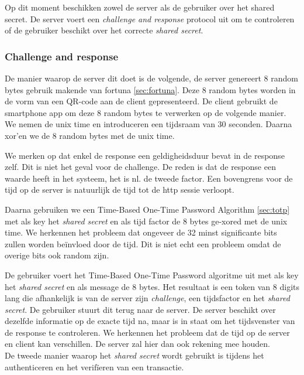 \documentclass[11pt]{article}
\begin{document}
Op dit moment beschikken zowel de server als de gebruiker over het shared secret. De server voert een \emph{challenge and response} protocol uit om te controleren of de gebruiker beschikt over het correcte \emph{shared secret}.\\

\subsubsection{Challenge and response}
De manier waarop de server dit doet is de volgende, de server genereert 8 random bytes gebruik makende van fortuna \ref{sec:fortuna}. Deze 8 random bytes worden in de vorm van een QR-code aan de client gepresenteerd. De client gebruikt de smartphone app om deze 8 random bytes te verwerken op de volgende manier.\\

We nemen de unix time en introduceren een tijdsraam van 30 seconden. Daarna xor'en we de 8 random bytes met de unix time.

We merken op dat enkel de response een geldigheidsduur bevat in de response zelf. Dit is niet het geval voor de challenge. De reden is dat de response een waarde heeft in het systeem, het is nl. de tweede factor. Een bovengrens voor de tijd op de server is natuurlijk de tijd tot de http sessie verloopt.

Daarna gebruiken we een Time-Based One-Time Password Algorithm \ref{sec:totp} met als key het \emph{shared secret} en als tijd factor de 8 bytes ge-xored met de unix time. We herkennen het probleem dat ongeveer de 32 minst significante bits zullen worden be\"invloed door de tijd. Dit is niet echt een probleem omdat de overige bits ook random zijn.

De gebruiker voert het Time-Based One-Time Password algoritme uit met als key het \emph{shared secret} en als message de 8 bytes. Het resultaat is een token van 8 digits lang die afhankelijk is van de server zijn \emph{challenge}, een tijdsfactor en het \emph{shared secret}. De gebruiker stuurt dit terug naar de server. De server beschikt over dezelfde informatie op de exacte tijd na, maar is in staat om het tijdsvenster van de response te controleren. We herkennen het probleem dat de tijd op de server en client kan verschillen. De server zal hier dan ook rekening mee houden.\\

De tweede manier waarop het \emph{shared secret} wordt gebruikt is tijdens het authenticeren en het verif\"ieren van een transactie.
\end{document}
